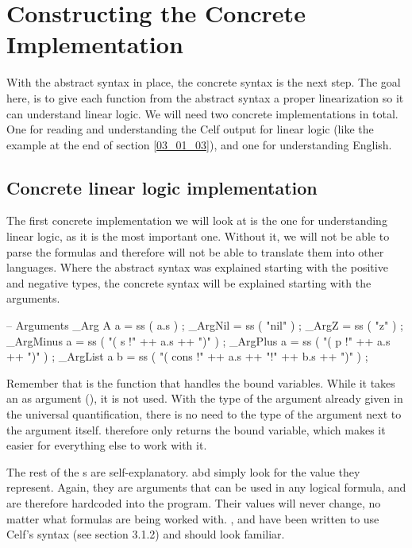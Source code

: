 \section{Constructing the Concrete Implementation}
\label{04_02}

With the abstract syntax in place, the concrete syntax is the next step. The goal here, is to give each function from the abstract syntax a proper linearization so it can understand linear logic. We will need two concrete implementations in total. One for reading and understanding the Celf output for linear logic (like the example at the end of section \ref{03_01_03}), and one for understanding English.

\subsection{Concrete linear logic implementation}
\label{04_02_01}

The first concrete implementation we will look at is the one for understanding linear logic, as it is the most important one. Without it, we will not be able to parse the formulas and therefore will not be able to translate them into other languages. Where the abstract syntax was explained starting with the positive and negative types, the concrete syntax will be explained starting with the arguments.

\begin{lstgf}
        -- Arguments
        _Arg A a                        = ss ( a.s ) ;
        _ArgNil                         = ss ( "nil" ) ;
        _ArgZ                           = ss ( "z" ) ;
        _ArgMinus a                     = ss ( "( s !" ++ a.s ++ ")" ) ;
        _ArgPlus a                      = ss ( "( p !" ++ a.s ++ ")" ) ;
        _ArgList a b                    = ss ( "( cons !" ++ a.s ++ "!" ++ b.s ++ ")" ) ;
\end{lstgf}

Remember that  is the function that handles the bound variables. While it takes an  as argument (), it is not used. With the type of the argument already given in the universal quantification, there is no need to the type of the argument next to the argument itself.  therefore only returns the bound variable, which makes it easier for everything else to work with it.

The rest of the s are self-explanatory.  abd  simply look for the value they represent. Again, they are arguments that can be used in any logical formula, and are therefore hardcoded into the program. Their values will never change, no matter what formulas are being worked with. , and  have been written to use Celf's syntax (see section 3.1.2) and should look familiar.


